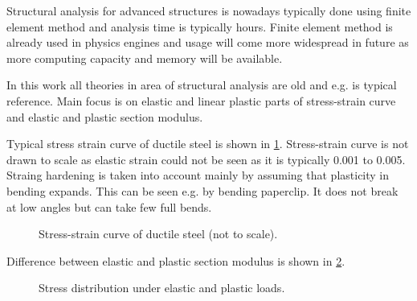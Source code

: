 Structural analysis for advanced structures is nowadays typically done using finite element method and 
analysis time is typically hours. Finite element method is already used in physics engines and usage will come 
more widespread in future as more computing capacity and memory will be available.

In this work all theories in area of structural analysis are old and e.g. 
\cite{timoshenko} is typical reference. Main focus is on elastic and 
linear plastic parts of stress-strain curve and elastic and plastic section modulus.

Typical stress strain curve of ductile steel is shown in \ref{fig:areas}.
Stress-strain curve is not drawn to scale as elastic strain could not be seen as it is typically 0.001 to 0.005.
Straing hardening is taken into account mainly by assuming that plasticity in bending expands.
This can be seen e.g. by bending paperclip. It does not break at low angles but can take few full bends. 

\begin{figure}[htb!]
\centering
{}
\caption{Stress-strain curve of ductile steel (not to scale).}
\label{fig:areas}
\end{figure}

Difference between elastic and plastic section modulus is shown in \ref{fig:wp}. 

\begin{figure}[htb!]
\centering
{}
\hspace{1cm}
\caption{Stress distribution under elastic and plastic loads.}
\label{fig:wp}
\end{figure}

